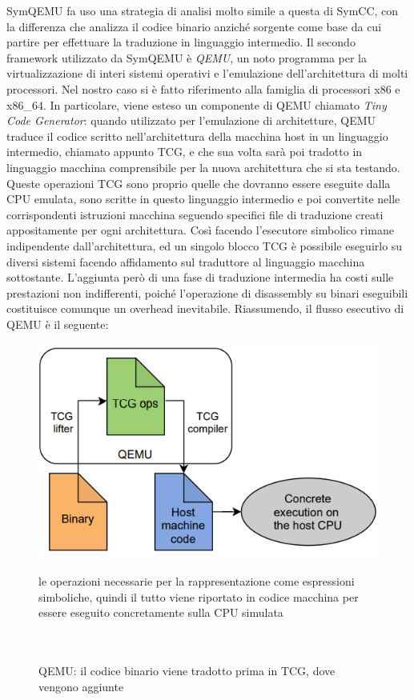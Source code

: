 \documentclass[Lau, oneside]{sapthesis}%
\begin{document}
\newpage
SymQEMU fa uso una strategia di analisi molto simile a questa di SymCC, con la differenza che analizza il codice binario anziché sorgente come base da cui partire per effettuare la traduzione in linguaggio intermedio.
\newline\newline
Il secondo framework utilizzato da SymQEMU è \textit{QEMU}, un noto programma per la virtualizzazione di interi sistemi operativi e l'emulazione dell'architettura di molti processori.
\newline
Nel nostro caso si è fatto riferimento alla famiglia di processori x86 e x86\_64.
\newline \newline
In particolare, viene esteso un componente di QEMU chiamato \textit{Tiny Code Generator}: quando utilizzato per l'emulazione di architetture, QEMU traduce il codice scritto nell'architettura della macchina host in un linguaggio intermedio, chiamato appunto TCG, e che sua volta sarà poi tradotto in linguaggio macchina comprensibile per la nuova architettura che si sta testando.
\newline
Queste operazioni TCG sono proprio quelle che dovranno essere eseguite dalla CPU emulata, sono scritte in questo linguaggio intermedio e poi convertite nelle corrispondenti istruzioni macchina seguendo specifici file di traduzione creati appositamente per ogni architettura.
\newline \newline
Così facendo l'esecutore simbolico rimane indipendente dall'architettura, ed un singolo blocco TCG è possibile eseguirlo su diversi sistemi facendo affidamento sul traduttore al linguaggio macchina sottostante.
\newline \newline
L'aggiunta però di una fase di traduzione intermedia ha costi sulle prestazioni non indifferenti, poiché l'operazione di disassembly su binari eseguibili  costituisce comunque un overhead inevitabile.
\newline \newline
Riassumendo, il flusso esecutivo di QEMU è il seguente:
\newline
\begin{figure}[h]
    \centering
    \includegraphics[width=0.625\linewidth]{foto/flusso_qemu.png}
    \caption{QEMU: il codice binario viene tradotto prima in TCG, dove vengono aggiunte} {le operazioni necessarie per la rappresentazione come espressioni simboliche, quindi} {il tutto viene riportato in codice macchina per essere eseguito concretamente sulla CPU simulata                                                                                                 }
    \label{fig:flusso_qemu}
\end{figure}
\end{document}
